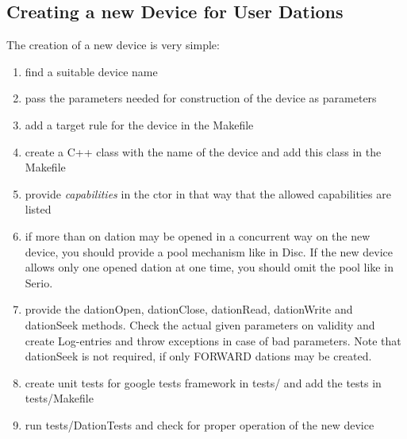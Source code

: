   
\subsection{Creating a new Device for User Dations}
The creation of a new device is very simple:
\begin{enumerate}
\item find a suitable device name
\item pass the parameters needed for construction of the device as
      parameters
\item add a target rule for the device in the Makefile
\item create a C++ class with the name of the device and add this class
      in the Makefile
\item provide {\em capabilities} in the ctor in that way that the allowed
      capabilities are listed
\item if more than on dation may be opened in a concurrent way on the new
      device, you should provide a pool mechanism like in Disc.
      If the new device allows only one opened dation at one time, you 
      should omit the pool like in Serio.
\item provide the dationOpen, dationClose, dationRead, dationWrite 
      and dationSeek methods. Check the actual given parameters on
      validity and create Log-entries and throw exceptions in case
      of bad parameters.
      Note that dationSeek is not required, if only FORWARD dations
      may be created.
\item create unit tests for google tests framework in tests/ and add the
      tests in tests/Makefile
\item run tests/DationTests and check for proper operation of the new device
\end{enumerate}

